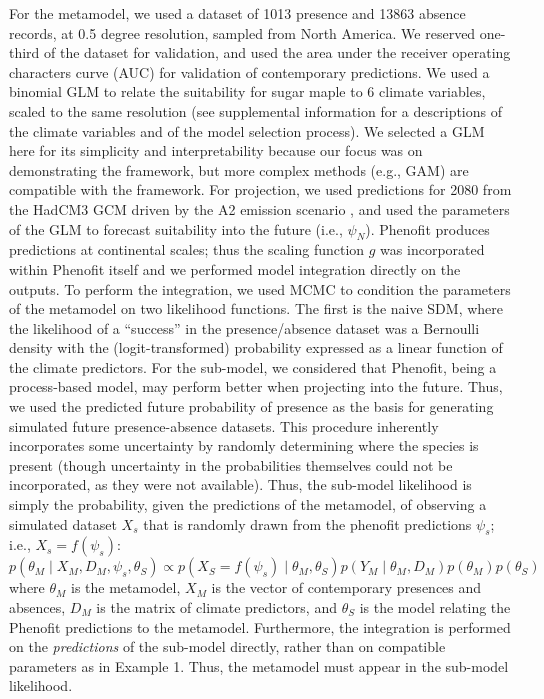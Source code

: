 \documentclass[11pt]{article}
\begin{document}
For the metamodel, we used a dataset of 1013 presence and 13863 absence records, at 0.5 degree resolution, sampled from North America.
We reserved one-third of the dataset for validation, and used the area under the receiver operating characters curve (AUC) for validation of contemporary predictions.
We used a binomial GLM to relate the suitability for sugar maple to 6 climate variables, scaled to the same resolution (see supplemental information for a descriptions of the climate variables and of the model selection process).
We selected a GLM here for its simplicity and interpretability because our focus was on demonstrating the framework, but more complex methods (e.g., GAM) are compatible with the framework.
For projection, we used predictions for 2080 from the HadCM3 GCM \citep{Pope2000} driven by the A2 emission scenario \citep{Nakicenovic2000}, and used the parameters of the GLM to forecast suitability into the future (i.e., \(\psi_N\)).
Phenofit produces predictions at continental scales; thus the scaling function \(g\) was incorporated within Phenofit itself and we performed model integration directly on the outputs.
To perform the integration, we used \ac{MCMC} to condition the parameters of the metamodel  on two likelihood functions.
The first is the naive SDM, where the likelihood of a ``success'' in the presence/absence dataset was a Bernoulli density with the (logit-transformed) probability expressed as a linear function of the climate predictors.
For the sub-model, we considered that Phenofit, being a process-based model, may perform better when projecting into the future.
Thus, we used the predicted future probability of presence as the basis for generating simulated future presence-absence datasets.
This procedure inherently incorporates some uncertainty by randomly determining where the species is present (though uncertainty in the probabilities themselves could not be incorporated, as they were not available).
Thus, the sub-model likelihood is simply the probability, given the predictions of the metamodel, of observing a simulated dataset \(X_s\) that is randomly drawn from the phenofit predictions \(\psi_s\); i.e., \(X_s = f(\psi_s)\):
\begin{equation}
\label{eq:integrated2}
	p( \theta_M \mid X_M, D_M, \psi_s, \theta_S )
	\propto 
	p( X_S = f(\psi_s)\mid \theta_M, \theta_S )
	p( Y_M \mid \theta_M, D_M ) 
	p( \theta_M )
	p( \theta_S )
\end{equation}
where \(\theta_M\) is the metamodel, 
\(X_M\) is the vector of contemporary presences and absences, 
\(D_M\) is the matrix of climate predictors,
and \(\theta_S\) is the model relating the Phenofit predictions to the metamodel.
Furthermore, the integration is performed on the \emph{predictions} of the sub-model directly, rather than on compatible parameters as in Example 1. 
Thus, the metamodel must appear in the sub-model likelihood.
\end{document}
